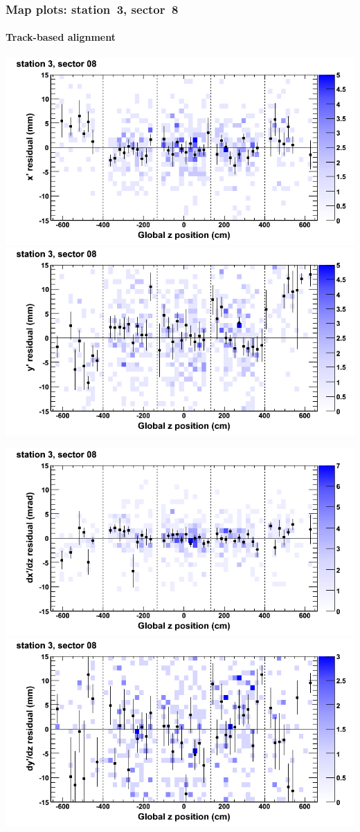 \documentclass[compress]{beamer}
\begin{document}
\begin{frame}
\frametitle{Map plots: station~3, sector~8}
\framesubtitle{Track-based alignment}
\includegraphics[width=0.5\linewidth]{mapplots_re05/DTvsz_st3sec08_x.png}
\includegraphics[width=0.5\linewidth]{mapplots_re05/DTvsz_st3sec08_y.png}

\includegraphics[width=0.5\linewidth]{mapplots_re05/DTvsz_st3sec08_dxdz.png}
\includegraphics[width=0.5\linewidth]{mapplots_re05/DTvsz_st3sec08_dydz.png}
\end{frame}
\end{document}
